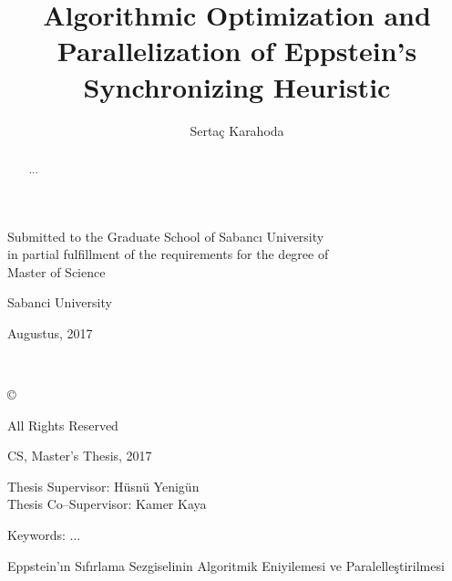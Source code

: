 \documentclass[12pt]{article}
\title{Algorithmic Optimization and Parallelization of Eppstein's Synchronizing Heuristic}
\author{Serta\c{c} Karahoda}
\date{}
\begin{document}
\maketitle
\thispagestyle{empty}
\vspace{1cm}

\begin{center}
Submitted to the Graduate School of Sabanc{\i} University \\
in partial fulfillment of the requirements for the degree of \\
Master of Science
\end{center}

\vspace{2cm}

\begin{center}
Sabanci University
\end{center}

\begin{center}
Augustus, 2017
\end{center}


\clearpage
$ $
\thispagestyle{empty}
\clearpage
$ $
\vspace{5cm}
\begin{center}
\copyright \hspace{0.1cm} \MyAuthor{}

All Rights Reserved
\thispagestyle{empty}
\end{center}
\clearpage

\begin{center}
\large
\MyTitle
\end{center}

\begin{center}
\MyAuthor

CS, Master's Thesis, 2017

Thesis Supervisor: H\"{u}sn\"{u} Yenig\"{u}n\\
Thesis Co--Supervisor: Kamer Kaya
\end{center}

\begin{center}
Keywords: ...
\end{center}

\begin{abstract}
...
\end{abstract}
\clearpage

\begin{center}
\large
Eppstein'\i{}n S\i{}f\i{}rlama Sezgiselinin Algoritmik Eniyilemesi ve Paralelle\c{s}tirilmesi
\end{center}
\end{document}

